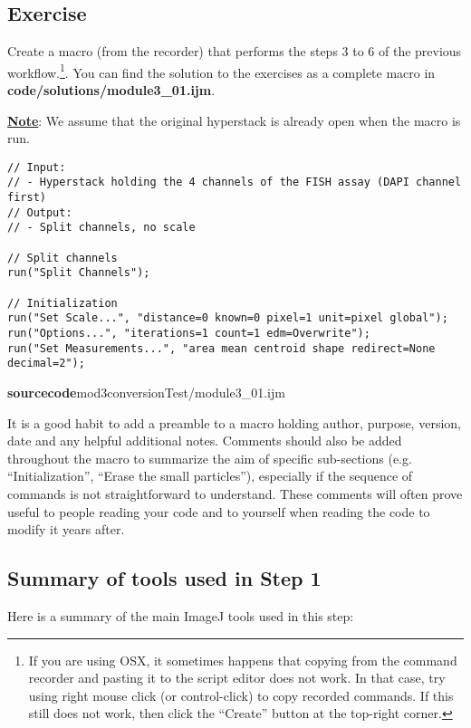 \subsection{Exercise }
Create a macro (from the recorder) that performs the steps 3 to 6 of the previous workflow.\footnote{If you are using OSX, it sometimes happens that copying from the command recorder and pasting it to the script editor does not work. In that case, try using right mouse click (or control-click) to copy recorded commands. If this still does not work, then click the ``Create'' button at the top-right corner.}. You can find the solution to the exercises as a complete macro in \textbf{code/solutions/module3\_01.ijm}.

\underline{\textbf{Note}}: We assume that the original hyperstack is already open when the macro is run.


\begin{lstlisting}[linerange={1-4}]
// Input: 
// - Hyperstack holding the 4 channels of the FISH assay (DAPI channel first)
// Output: 
// - Split channels, no scale

// Split channels
run("Split Channels");

// Initialization
run("Set Scale...", "distance=0 known=0 pixel=1 unit=pixel global");
run("Options...", "iterations=1 count=1 edm=Overwrite");
run("Set Measurements...", "area mean centroid shape redirect=None decimal=2");
\end{lstlisting}
\textbf{sourcecode}\colon mod3conversionTest/module3_01.ijm

It is a good habit to add a preamble to a macro holding author, purpose, version, date and any helpful additional notes. Comments should also be added throughout the macro to summarize the aim of specific sub-sections (e.g. ``Initialization'', ``Erase the small particles''), especially if the sequence of commands is not straightforward to understand. These comments will often prove useful to people reading your code and to yourself when reading the code to modify it years after.

\subsection{Summary of tools used in Step 1}

Here is a summary of the main ImageJ tools used in this step:

